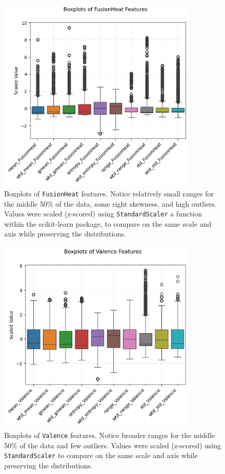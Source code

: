 \documentclass{article}      %
\begin{document}
\begin{figure}[h]
	\centering
	\includegraphics[width=0.85\textwidth]{figures/plt_box_fusionHeat.png}
	\caption{Boxplots of \texttt{FusionHeat} features. Notice relatively small ranges for the middle 50\% of the data, some right skewness, and high outliers. Values were scaled (z-scored) using \texttt{StandardScaler} a function within the scikit-learn package, to compare on the same scale and axis while preserving the distributions.}
	\label{fig:fusionheat_boxplots}
\end{figure}

\begin{figure}[h]
	\centering
	\includegraphics[width=0.85\textwidth]{figures/plt_box_valence.png}
	\caption{Boxplots of \texttt{Valence} features. Notice broader ranges for the middle 50\% of the data and few outliers. Values were scaled (z-scored) using \texttt{StandardScaler} to compare on the same scale and axis while preserving the distributions.}
	\label{fig:valence_boxplots}
\end{figure}
\end{document}
